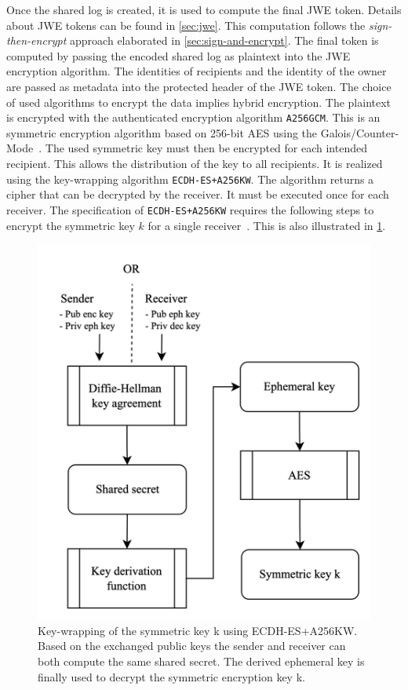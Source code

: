 \documentclass[../main.tex]{subfiles}
\begin{document}
Once the  shared log is created, it is used to compute the final JWE token.
Details about JWE tokens can be found in \cref{sec:jwe}.
This computation follows the \emph{sign-then-encrypt} approach elaborated in \cref{sec:sign-and-encrypt}.
The final token is computed by passing the encoded shared log as plaintext into the JWE encryption algorithm.
The identities of recipients and the identity of the owner are passed as metadata into the protected header of the JWE token.
The choice of used algorithms to encrypt the data implies hybrid encryption.
The plaintext is encrypted with the authenticated encryption algorithm \verb|A256GCM|.
This is an symmetric encryption algorithm based on 256-bit AES using the Galois/Counter-Mode~\cite{JWA2015}.
The used symmetric key must then be encrypted for each intended recipient.
This allows the distribution of the key to all recipients.
It is realized using the key-wrapping algorithm \verb|ECDH-ES+A256KW|.
The algorithm returns a cipher that can be decrypted by the receiver.
It must be executed once for each receiver.
The specification of \verb|ECDH-ES+A256KW| requires the following steps to encrypt the symmetric key $k$ for a single receiver~\cite[100]{Barker2017}.
This is also illustrated in \cref{fig:key_wrapping}.
\begin{figure}[ht]
    \includegraphics[scale=0.2]{../img/05/key_wrapping.png}
    \centering
    \caption[Key-wrapping ECDH-ES+A256KW]{
        Key-wrapping of the symmetric key k using ECDH-ES+A256KW.
        Based on the exchanged public keys the sender and receiver can both compute the same shared secret.
        The derived ephemeral key is finally used to decrypt the symmetric encryption key k.}
    \label{fig:key_wrapping}
\end{figure}
\end{document}
